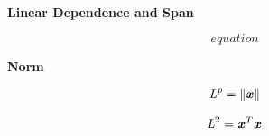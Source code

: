 \documentclass[12pt]{minimal}
\begin{document}
\textbf{Linear Dependence and Span} 

\begin{equation}
    equation
\end{equation}


\textbf{Norm}

\begin{equation}
    \begin{split}
        \textit{L}^{\textit{p}} = \Vert \textbf{\textit{x}} \Vert  \\
    \end{split}
\end{equation}


\begin{equation}
    \begin{split}
        \textit{L}^2 = \textbf{\textit{x}}^{T}\textbf{\textit{x}}
    \end{split}
\end{equation}
\end{document}
